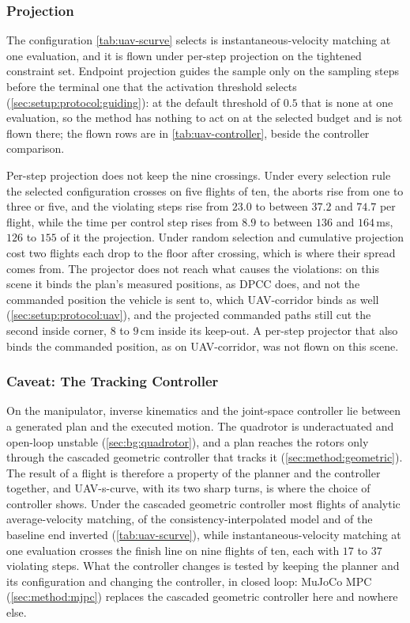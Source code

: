 \subsubsection{Projection}\label{sec:res:uav:scurve:projection}

The configuration \autoref{tab:uav-scurve} selects is instantaneous-velocity matching at one evaluation,
and it is flown under per-step projection on the tightened constraint set. Endpoint projection guides the
sample only on the sampling steps before the terminal one that the activation threshold selects
(\autoref{sec:setup:protocol:guiding}): at the default threshold of $0.5$ that is none at one evaluation, so
the method has nothing to act on at the selected budget and is not flown there; the flown rows are in
\autoref{tab:uav-controller}, beside the controller comparison.

Per-step projection does not keep the nine crossings. Under every selection rule the selected configuration
crosses on five flights of ten, the aborts rise from one to three or five, and the violating steps rise from
$23.0$ to between $37.2$ and $74.7$ per flight, while the time per control step rises from $8.9$ to between
$136$ and $164$\,ms, $126$ to $155$ of it the projection. Under random selection and cumulative projection cost
two flights each drop to the floor after crossing, which is where their spread comes from. The projector
does not reach what causes the violations: on this scene it binds the plan's measured positions, as \ac{DPCC}
does, and not the commanded position the vehicle is sent to, which UAV-corridor binds as well
(\autoref{sec:setup:protocol:uav}), and the projected commanded paths still cut the second inside corner,
$8$ to $9$\,cm inside its keep-out.
A per-step projector that also binds the commanded position, as on UAV-corridor, was not flown on this
scene.

\subsubsection{Caveat: The Tracking Controller}\label{sec:res:uav:controller}

On the manipulator, inverse kinematics and the joint-space controller lie between a generated plan and
the executed motion. The quadrotor is underactuated and open-loop unstable
(\autoref{sec:bg:quadrotor}), and a plan reaches the rotors only through the cascaded geometric
controller that tracks it (\autoref{sec:method:geometric}). The result of a flight is therefore a
property of the planner and the controller together, and UAV-s-curve, with its two sharp turns, is where
the choice of controller shows. Under the cascaded geometric controller most flights of analytic
average-velocity matching, of the consistency-interpolated model and of the baseline end inverted
(\autoref{tab:uav-scurve}), while instantaneous-velocity matching at one evaluation crosses the finish line
on nine flights of ten, each with $17$ to $37$ violating steps. What the controller changes is tested by
keeping the planner and its configuration and changing the controller, in closed loop: MuJoCo MPC (\autoref{sec:method:mjpc}) replaces the cascaded
geometric controller here and nowhere else.

